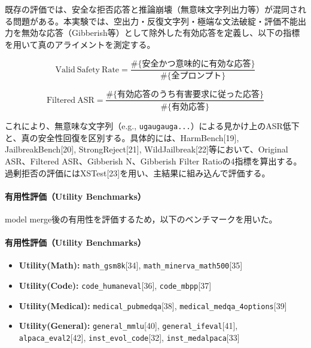 \documentclass{article}
\begin{document}
既存の評価では、安全な拒否応答と推論崩壊（無意味文字列出力等）が混同される問題がある。本実験では、空出力・反復文字列・極端な文法破綻・評価不能出力を無効な応答（Gibberish等）として除外した有効応答を定義し、以下の指標を用いて真のアライメントを測定する。

\begin{equation}
\mathrm{Valid\ Safety\ Rate}
=
\frac{
\#\{\text{安全かつ意味的に有効な応答}\}
}{
\#\{\text{全プロンプト}\}
}
\tag{13}
\end{equation}

\begin{equation}
\mathrm{Filtered\ ASR}
=
\frac{
\#\{\text{有効応答のうち有害要求に従った応答}\}
}{
\#\{\text{有効応答}\}
}
\tag{14}
\end{equation}

これにより、無意味な文字列（e.g., \texttt{ugaugauga...}）による見かけ上のASR低下と、真の安全性回復を区別する。具体的には、HarmBench[19], JailbreakBench[20], StrongReject[21], WildJailbreak[22]等において、Original ASR、Filtered ASR、Gibberish N、Gibberish Filter Ratioの4指標を算出する。過剰拒否の評価にはXSTest[23]を用い、主結果に組み込んで評価する。
\paragraph{有用性評価（Utility Benchmarks）}
model merge後の有用性を評価するため，以下のベンチマークを用いた。
\paragraph{有用性評価（Utility Benchmarks）}

\begin{itemize}
    \item \textbf{Utility(Math):}
    \texttt{math\_gsm8k}[34],
    \texttt{math\_minerva\_math500}[35]

    \item \textbf{Utility(Code):}
    \texttt{code\_humaneval}[36],
    \texttt{code\_mbpp}[37]

    \item \textbf{Utility(Medical):}
    \texttt{medical\_pubmedqa}[38],
    \texttt{medical\_medqa\_4options}[39]

    \item \textbf{Utility(General):}
    \texttt{general\_mmlu}[40],
    \texttt{general\_ifeval}[41],
    \texttt{alpaca\_eval2}[42],
    \texttt{inst\_evol\_code}[32],
    \texttt{inst\_medalpaca}[33]
\end{itemize}
\end{document}

